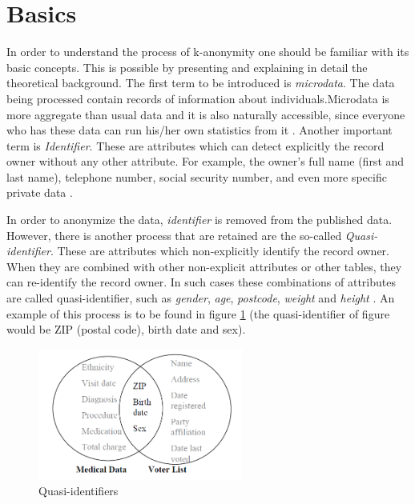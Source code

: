 \documentclass{llncs}
\begin{document}
\section{Basics}
In order to understand the process of k-anonymity one should be familiar with its basic concepts. This is possible by presenting and explaining in detail the theoretical background.  The first term to be introduced is \textit{microdata}. The data being processed contain records of information about individuals.Microdata is more aggregate than usual data and it is also naturally accessible, since everyone who has these data can run his/her own statistics from it \cite{microdataweb}. 
Another important term is \textit{Identifier}. These are attributes which can detect explicitly the record owner without any other attribute. For example, the owner’s full name (first and last name), telephone number, social security number, and even more specific private data \cite{domingo2008critique}.

In order to anonymize the data, \textit{identifier} is removed from the published data. However, there is another process that are retained are the so-called \textit{Quasi-identifier}. These are attributes which non-explicitly identify the record owner. When they are combined with other non-explicit attributes or other tables, they can re-identify the record owner. In such cases these combinations of attributes are called quasi-identifier, such as \textit{gender}, \textit{age}, \textit{postcode}, \textit{weight} and \textit{height} \cite{dalenius1986finding}. An example of this process is to be found in figure \ref{quasiidentifier} (the quasi-identifier of figure would be ZIP (postal code), birth date and sex).
\begin{figure}[]
	\centering
	\includegraphics[width=0.6\textwidth]{linkingdata.png}
	\caption{Quasi-identifiers \cite{sweeney2002k}}%
	\label{quasiidentifier}
\end{figure}
\end{document}
